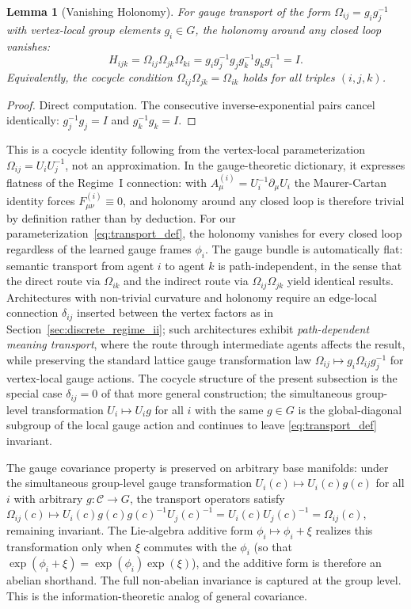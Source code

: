 \documentclass[11pt]{article}
\newtheorem{lemma}{Lemma}
\begin{document}
\begin{lemma}[Vanishing Holonomy]
\label{thm:vanishing_holonomy}
For gauge transport of the form $\Omega_{ij} = g_ig_j^{-1}$ with vertex-local group elements $g_i \in G$, the holonomy around any closed loop vanishes:
\begin{equation}
H_{ijk} = \Omega_{ij}\Omega_{jk}\Omega_{ki}
= g_ig_j^{-1}g_jg_k^{-1}g_kg_i^{-1}
= I.
\label{eq:holonomy}
\end{equation}
Equivalently, the cocycle condition $\Omega_{ij}\Omega_{jk} = \Omega_{ik}$ holds for all triples $(i,j,k)$.
\end{lemma}

\begin{proof}
Direct computation. The consecutive inverse-exponential pairs cancel identically: $g_j^{-1} g_j = I$ and $g_k^{-1} g_k = I$.
\end{proof}

This is a cocycle identity following from the vertex-local parameterization $\Omega_{ij} = U_iU_j^{-1}$, not an approximation. In the gauge-theoretic dictionary, it expresses flatness of the Regime~I connection: with $A^{(i)}_\mu = U_i^{-1}\partial_\mu U_i$ the Maurer-Cartan identity forces $F^{(i)}_{\mu\nu} \equiv 0$, and holonomy around any closed loop is therefore trivial by definition rather than by deduction. For our parameterization~\eqref{eq:transport_def}, the holonomy vanishes for every closed loop regardless of the learned gauge frames $\phi_i$. The gauge bundle is automatically flat: semantic transport from agent $i$ to agent $k$ is path-independent, in the sense that the direct route via $\Omega_{ik}$ and the indirect route via $\Omega_{ij}\Omega_{jk}$ yield identical results. Architectures with non-trivial curvature and holonomy require an edge-local connection $\delta_{ij}$ inserted between the vertex factors as in Section~\ref{sec:discrete_regime_ii}; such architectures exhibit \emph{path-dependent meaning transport}, where the route through intermediate agents affects the result, while preserving the standard lattice gauge transformation law $\Omega_{ij} \mapsto g_i \Omega_{ij} g_j^{-1}$ for vertex-local gauge actions. The cocycle structure of the present subsection is the special case $\delta_{ij} = 0$ of that more general construction; the simultaneous group-level transformation $U_i \mapsto U_i g$ for all $i$ with the same $g \in G$ is the global-diagonal subgroup of the local gauge action and continues to leave \eqref{eq:transport_def} invariant.

The gauge covariance property is preserved on arbitrary base manifolds: under the simultaneous group-level gauge transformation $U_i(c) \mapsto U_i(c) g(c)$ for all $i$ with arbitrary $g: \mathcal{C} \to G$, the transport operators satisfy $\Omega_{ij}(c) \mapsto U_i(c) g(c) g(c)^{-1} U_j(c)^{-1} = U_i(c) U_j(c)^{-1} = \Omega_{ij}(c)$, remaining invariant. The Lie-algebra additive form $\phi_i \mapsto \phi_i + \xi$ realizes this transformation only when $\xi$ commutes with the $\phi_i$ (so that $\exp(\phi_i + \xi) = \exp(\phi_i)\exp(\xi)$), and the additive form is therefore an abelian shorthand. The full non-abelian invariance is captured at the group level. This is the information-theoretic analog of general covariance.
\end{document}
